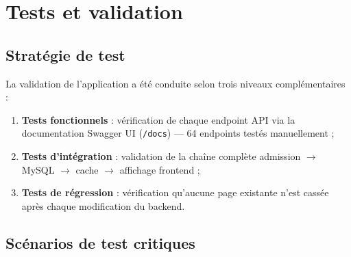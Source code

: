 \documentclass[12pt,a4paper]{report}
\begin{document}
	\section{Tests et validation}
	
	\subsection{Stratégie de test}
	
	La validation de l'application a été conduite selon trois niveaux complémentaires :
	
	\begin{enumerate}
		\item \textbf{Tests fonctionnels} : vérification de chaque endpoint API via la
		documentation Swagger UI (\texttt{/docs}) — 64 endpoints testés manuellement ;
		\item \textbf{Tests d'intégration} : validation de la chaîne complète
		admission $\to$ MySQL $\to$ cache $\to$ affichage frontend ;
		\item \textbf{Tests de régression} : vérification qu'aucune page existante n'est
		cassée après chaque modification du backend.
	\end{enumerate}
	
	\subsection{Scénarios de test critiques}
	
\end{document}
